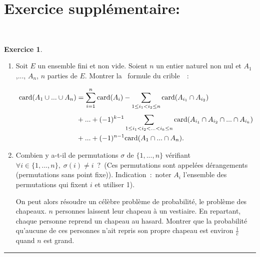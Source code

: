 \documentclass[a4paper,10pt]{article}
\theoremstyle{definition}
\theoremstyle{definition}
\newtheorem{exo}{Exercice}
\begin{document}
\section*{Exercice supplémentaire:}\hfill\\[-0.5cm]
\begin{exo}\quad\\
	\begin{enumerate}
		\item  Soit $E$ un ensemble fini et non vide. Soient $n$ un entier naturel non nul et $A_1$,..., $A_n$, $n$ parties de $E$. Montrer la \og~formule du crible~\fg~:
		
		\begin{align*}\ensuremath
		\mbox{card}(A_1\cup...\cup A_n)&=\sum_{i=1}^{n}\mbox{card}(A_i)-\sum_{1\leq i_1< i_2\leq n}^{}\mbox{card}(A_{i_1}\cap A_{i_2})\\
		&+...+(-1)^{k-1}\sum_{1\leq i_1<i_2<...<i_k\leq n}^{}\mbox{card}(A_{i_1}\cap A_{i_2}\cap...\cap A_{i_k})\\
		&+...+(-1)^{n-1}\mbox{card}(A_1\cap...\cap A_n).
		\end{align*}
		
		\item  Combien y a-t-il de permutations $\sigma$ de $\{1,...,n\}$ vérifiant $\forall i\in\{1,...,n\},\;\sigma(i)\neq i$~?~(Ces permutations sont appelées dérangements (permutations sans point fixe)). Indication~:~noter $A_i$ l'ensemble des permutations qui fixent $i$ et utiliser 1).
		
		On peut alors résoudre un célèbre problème de probabilité, le problème des chapeaux. $n$ personnes laissent leur chapeau à un vestiaire. En repartant, chaque personne reprend un chapeau au hasard. Montrer que la probabilité qu'aucune de ces personnes n'ait repris son propre chapeau est environ $\frac{1}{e}$ quand $n$ est grand.
	\end{enumerate}	
	
	\centering
	\rule{1\linewidth}{0.6pt}
\end{exo}

\newpage
\end{document}
